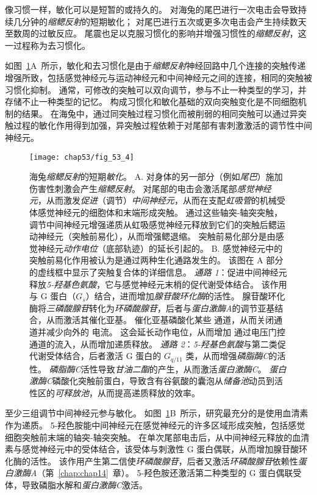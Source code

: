 像习惯一样，敏化可以是短暂的或持久的。
对海兔的尾巴进行一次电击会导致持续几分钟的\textit{缩鳃反射}的短期敏化；
对尾巴进行五次或更多次电击会产生持续数天至数周的过敏反应。
尾震也足以克服习惯化的影响并增强习惯性的\textit{缩鳃反射}，这一过程称为去习惯化。


如图~\ref{fig:53_4}A~所示，敏化和去习惯化是由于\textit{缩鳃反射}神经回路中几个连接的突触传递增强所致，包括感觉神经元与运动神经元和中间神经元之间的连接，相同的突触被习惯化抑制。
通常，可修改的突触可以双向调节，参与不止一种类型的学习，并存储不止一种类型的记忆。
构成习惯化和敏化基础的双向突触变化是不同细胞机制的结果。
在海兔中，通过同突触过程习惯化而被削弱的相同突触可以通过异突触过程的敏化作用得到加强，异突触过程依赖于对尾部有害刺激激活的调节性中间神经元。


\begin{figure}[htbp]
	\centering
	\texttt{[image: chap53/fig\_53\_4]}
	\caption{海兔\textit{缩鳃反射}的短期\textit{敏化}。
		A. 对身体的另一部分（例如\textit{尾巴}）施加伤害性刺激会产生\textit{缩鳃反射}。
		对尾部的电击会激活尾部\textit{感觉神经元}，从而激发\textit{促进}（调节）\textit{中间神经元}，从而在支配\textit{虹吸管}的机械受体感觉神经元的细胞体和末端形成突触。
		通过这些轴突-轴突突触，调节中间神经元增强递质从虹吸感觉神经元释放到它们的突触后鳃运动神经元（突触前易化），从而增强鳃退缩。
		突触前易化部分是由感觉神经元\textit{动作电位}（底部轨迹）的延长引起的\cite{pinsker1970habituation,klein1980mechanism}。
		B. 感觉神经元中的突触前易化作用被认为是通过两种生化通路发生的。
		该图在 A 部分的虚线框中显示了突触复合体的详细信息。
		\textit{通路 1}：促进中间神经元释放\textit{5-羟基色氨酸}，它与感觉神经元末梢的促代谢受体结合。
		该作用与 G 蛋白（$ G_s $）结合，进而增加\textit{腺苷酸环化酶}的活性。
		腺苷酸环化酶将\textit{三磷酸腺苷}转化为\textit{环磷酸腺苷}，后者与\textit{蛋白激酶A}的调节亚基结合，从而激活其催化亚基。
		催化亚基磷酸化某些  通道，从而关闭通道并减少向外的  电流。
		这会延长动作电位，从而增加  通过电压门控  通道的流入，从而增加递质释放。
		\textit{通路 2}：\textit{5-羟基色氨酸}与第二类促代谢受体结合，后者激活 G 蛋白的 $ G_{q/11} $ 类，从而增强\textit{磷脂酶C}的活性。
		\textit{磷脂酶C}活性导致\textit{甘油二酯}的产生，从而激活\textit{蛋白激酶C}。
		\textit{蛋白激酶C}磷酸化突触前蛋白，导致含有谷氨酸的囊泡从\textit{储备池}动员到活性区的\textit{可释放池}，从而提高递质释放的效率。}
	\label{fig:53_4}
\end{figure}


至少三组调节中间神经元参与敏化。
如图~\ref{fig:53_4}B~所示，研究最充分的是使用血清素作为递质。
5-羟色胺能中间神经元在感觉神经元的许多区域形成突触，包括感觉细胞突触前末端的轴突-轴突突触。
在单次尾部电击后，从中间神经元释放的血清素与感觉神经元中的受体结合，该受体与刺激性 G 蛋白偶联，从而增加腺苷酸环化酶的活性。
该作用产生第二信使\textit{环磷酸腺苷}，后者又激活\textit{环磷酸腺苷}依赖性\textit{蛋白激酶A}（第~\ref{chap:chap14}~章）。
5-羟色胺还激活第二种类型的 G 蛋白偶联受体，导致磷脂水解和\textit{蛋白激酶C}激活。


